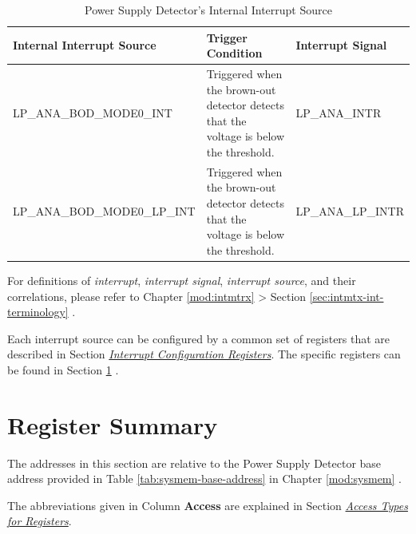 \documentclass[main\_\_EN.tex]{subfiles}
\begin{document}
\begin{longtable}{ |l | L{7.3cm} | l | }
\caption{Power Supply Detector's Internal Interrupt Source} \label{tab:psdet-int-sources}
\\ \hline
{}
\textbf{Internal Interrupt Source} & \textbf{Trigger Condition}  &  \textbf{Interrupt Signal}\\ \hline
\label{int:LPANABODMODE0INT}LP\_ANA\_BOD\_MODE0\_INT  & Triggered when the brown-out detector detects that the voltage is below
the threshold.  & LP\_ANA\_INTR  \\ \hline
\label{int:LPANABODMODE0LPINT}LP\_ANA\_BOD\_MODE0\_LP\_INT & Triggered when the brown-out detector detects that the voltage is below
the threshold.  & LP\_ANA\_LP\_INTR \\ \hline
\end{longtable}

\begin{tiplisting}
For definitions of \textit{interrupt}, \textit{interrupt signal}, \textit{interrupt source}, and their correlations, please refer to Chapter \ref{mod:intmtrx} \textit{} > Section \ref{sec:intmtx-int-terminology} \textit{}.
\end{tiplisting}

Each interrupt source can be configured by a common set of registers that are described in Section \hyperref[interrupt-config-registers]{\textit{Interrupt Configuration Registers}}. The specific registers can be found in Section \ref{sec:psdet-reg-summ} \textit{}.



\newpage
\hypertarget{psdet-reg-summ}{}
\section{Register Summary}
\label{sec:psdet-reg-summ}

The addresses in this section are relative to the Power Supply Detector base address provided in Table \ref{tab:sysmem-base-address} in Chapter \ref{mod:sysmem} \textit{}.

The abbreviations given in Column \textbf{Access} are explained in Section \hyperref[glossary-access-types]{\textit{Access Types for Registers}}.
\end{document}
